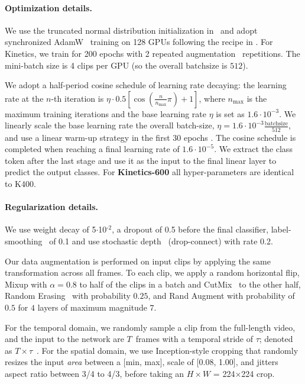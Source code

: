 \documentclass[10pt,twocolumn,letterpaper]{article}
\def\x{$\times$}
\begin{document}
\paragraph{Optimization details.}
We use the truncated normal distribution initialization in~\cite{hanin2018start} and adopt synchronized AdamW~\cite{loshchilov2018fixing} training on 128 GPUs following the recipe in \cite{touvron2020training,Feichtenhofer2019}.
For Kinetics, we train for 200 epochs with 2 repeated augmentation~\cite{hoffer2020augment} repetitions. The mini-batch size is 4 clips per GPU (so the overall $\mathrm{batchsize}$ is $512$). 


We adopt a half-period cosine schedule \cite{Loshchilov2016} of learning rate decaying: the learning rate at the $n$-th iteration is $\eta\cdot0.5[\cos(\frac{n}{n_\text{max}}\pi)+1]$, where $n_\text{max}$ is the maximum training iterations and the base learning rate $\eta$ is set as $1.6\cdot10^{-3}$. We linearly scale the base learning rate \wrt the overall batch-size, $\eta =1.6{\cdot}10^{-3}\frac{\mathrm{batchsize}}{512}$, and use a linear warm-up strategy in the first 30 epochs \cite{Goyal2017}. The cosine schedule is completed when reaching a final learning rate of $1.6\cdot10^{-5}$. We extract the class token after the last stage and use it as the input to the final linear layer to predict the output classes.  
For \textbf{Kinetics-600} all hyper-parameters are identical to K400.  

\paragraph{Regularization details.}
We use weight decay of 5$\cdot$10$^\text{-2}$, a dropout \cite{Hinton2012b} of 0.5 before the final classifier, label-smoothing~\cite{Szegedy2015a} of 0.1 and  use stochastic depth~ \cite{huang2016deep} (\ie drop-connect) with rate 0.2.

Our data augmentation is performed on input clips by applying the same transformation across all frames. 
To each clip, we apply a random horizontal flip, 
Mixup \cite{zhang2018mixup} with $\alpha=0.8$ to half of the clips in a batch and CutMix~\cite{yun2019cutmix} to the other half, Random Erasing~\cite{zhong2020random} with probability $0.25$, and 
Rand Augment \cite{cubuk2020randaugment} with probability of $0.5$ for $4$ layers of maximum magnitude $7$.

For the temporal domain, we randomly sample a clip from the full-length video, and the input to the network are  $T$~frames with a temporal stride of $\tau$; denoted as $T\times\tau$~\cite{Feichtenhofer2019}. For the spatial domain, we use  Inception-style \cite{Szegedy15} cropping that randomly resizes the input \textit{area} between a $[$min, max$]$, scale of $[$0.08,  1.00$]$, and jitters aspect ratio between 3/4 to 4/3, before taking an $H\times W$ = 224\x224 crop. 
\end{document}
